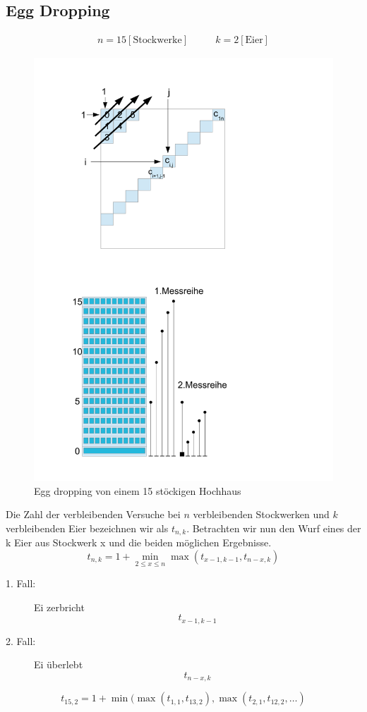 \documentclass[a4paper,twoside,10pt]{report}
\begin{document}
\subsection{Egg Dropping}
\begin{align*}&n=15[\mbox{Stockwerke}]&\,&\,&k=2[\mbox{Eier}]&
\end{align*}
\begin{figure}[H]\center
\includegraphics[trim= 2cm 1.5cm 7.5cm 16cm,clip,width=\columnwidth]{figures/skyscraper.pdf}
\caption{Egg dropping von einem 15 stöckigen Hochhaus}
\end{figure}
Die Zahl der verbleibenden Versuche bei $n$ verbleibenden Stockwerken und $k$ verbleibenden Eier bezeichnen wir als $t_{n,k}$.
Betrachten wir nun den Wurf eines der k Eier aus Stockwerk x und die beiden möglichen Ergebnisse.
\[t_{n,k}=1+\min_{2\le x\le n}\max(t_{x-1,k-1},t_{n-x,k})\]
\begin{description}
\item[1. Fall: ] Ei zerbricht\[t_{x-1,k-1}\]
\item[2. Fall: ] Ei überlebt\[t_{n-x,k}\]
\end{description}
\[t_{15,2}=1+\min(\max(t_{1,1},t_{13,2}),\max(t_{2,1},t_{12,2},\hdots)\]
\end{document}
